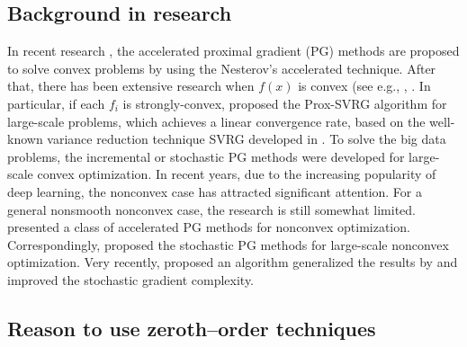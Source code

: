 \documentclass{article}
\theoremstyle{definition}
\theoremstyle{remark}
\begin{document}
\subsection{Background in research}
{\color{Green}
In recent research \cite{beck2009fast},
the accelerated proximal gradient (PG) methods are proposed to solve convex problems by using the Nesterov's accelerated technique.  
}
{\color{Violet}
After that, there has been extensive research when $f(x)$ is convex (see e.g., {  
\cite{nesterov2013gradient}}, \cite{xiao2014proximal,defazio2014saga,lan2017optimal,allen2017katyusha}. In particular, if each $f_i$ is strongly-convex, \cite{xiao2014proximal} proposed the Prox-SVRG algorithm {\color{green} for large-scale problems}, which achieves a linear convergence rate, based on the well-known variance reduction technique SVRG
developed in \cite{johnson2013accelerating}. To solve the big data problems, the incremental or stochastic PG methods \cite{bertsekas2011incremental,xiao2014proximal} were developed for large-scale convex optimization. In recent years, due to the increasing popularity of deep learning, the nonconvex case has attracted significant attention. For a general nonsmooth nonconvex case, the research is still somewhat limited.  \cite{li2015accelerated} presented a class of accelerated PG methods for nonconvex optimization. {\color{Green} Correspondingly, \cite{ghadimi2016accelerated,reddi2016proximal} proposed the stochastic PG methods for large-scale nonconvex optimization.}
Very recently, \cite{li2018simple} proposed an algorithm generalized the results by \cite{reddi2016proximal} and improved the stochastic gradient complexity. 
}
\subsection{Reason to use zeroth--order techniques}
\end{document}
